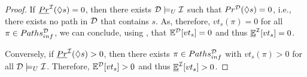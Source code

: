 \begin{proof}
    If $\underline{Pr}^{\mathcal{I}}(\lozenge s) = 0$, then there exists $\mathcal{D} \models_U \mathcal{I}$ such that $Pr^{\mathcal{D}}(\lozenge s) = 0$, i.e., there exists no path in $\mathcal{D}$ that contains $s$. As, therefore, $vt_s(\pi) = 0$ for all $\pi \in Paths^{\mathcal{D}}_{inf}$, we can conclude, using , that $\mathbb{E}^{\mathcal{D}}[vt_s] = 0$ and thus $\mathbb{\underline{E}}^{\mathcal{I}}[vt_s] = 0$. 
    
    Conversely, if $\underline{Pr}^{\mathcal{I}}(\lozenge s) > 0$, then there exists $\pi \in Paths^{\mathcal{D}}_{inf}$ with $vt_s(\pi) > 0$ for all $\mathcal{D} \models_U \mathcal{I}$. Therefore, $\mathbb{E}^{\mathcal{D}}[vt_s] > 0$ and thus $\mathbb{\underline{E}}^{\mathcal{I}}[vt_s] > 0$.
\end{proof}













